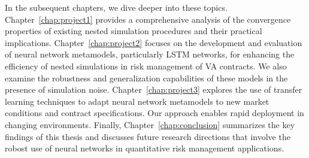 In the subsequent chapters, we dive deeper into these topics.
Chapter~\ref{chap:project1} provides a comprehensive analysis of the convergence properties of existing nested simulation procedures and their practical implications.
Chapter~\ref{chap:project2} focuses on the development and evaluation of neural network metamodels, particularly LSTM networks, for enhancing the efficiency of nested simulations in risk management of VA contracts.
We also examine the robustness and generalization capabilities of these models in the presence of simulation noise.
Chapter~\ref{chap:project3} explores the use of transfer learning techniques to adapt neural network metamodels to new market conditions and contract specifications.
Our approach enables rapid deployment in changing environments.
Finally, Chapter~\ref{chap:conclusion} summarizes the key findings of this thesis and discusses future research directions that involve the robost use of neural networks in quantitative risk management applications.
